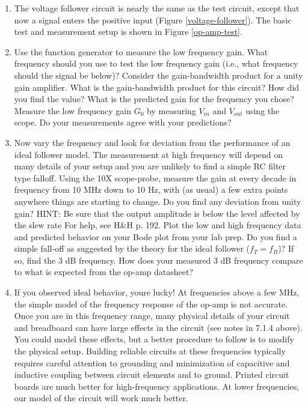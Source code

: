 \documentclass[10pt]{PhysLab1C} %
\begin{document}
\begin{enumerate}
\def\labelenumi{\arabic{enumi}.}
\item
  The voltage follower circuit is nearly the same as the test circuit,
  except that now a signal enters the positive input (Figure \ref{voltage-follower}). The basic
  test and measurement setup is shown in Figure \ref{op-amp-test}.
\item
  Use the function generator to measure the low frequency gain. What
  frequency should you use to test the low frequency gain (i.e., what
  frequency should the signal be below)? Consider the gain-bandwidth
  product for a unity gain amplifier. What is the gain-bandwidth product
  for this circuit? How did you find the value? What is the predicted
  gain for the frequency you chose? Measure the low frequency gain
  \(G_0\) by measuring \(V_{in}\) and \(V_{out}\) using the scope. Do
  your measurements agree with your predictions?
\item
  Now vary the frequency and look for deviation from the performance of
  an ideal follower model. The measurement at high frequency will depend
  on many details of your setup and you are unlikely to find a simple RC
  filter type falloff. Using the 10X scope-probe, measure the gain at
  every decade in frequency from 10 MHz down to 10 Hz, with (as usual) a
  few extra points anywhere things are starting to change. Do you find
  any deviation from unity gain? HINT: Be sure that the output amplitude
  is below the level affected by the slew rate For help, see H\&H p.
  192. Plot the low and high frequency data and predicted behavior on
  your Bode plot from your lab prep. Do you find a simple fall-off as
  suggested by the theory for the ideal follower (\(f_T=f_B\))? If so,
  find the 3 dB frequency. How does your measured 3 dB frequency compare
  to what is expected from the op-amp datasheet?
\item
  If you observed ideal behavior, you\textquotesingle re lucky! At
  frequencies above a few MHz, the simple model of the frequency
  response of the op-amp is not accurate. Once you are in this frequency
  range, many physical details of your circuit and breadboard can have
  large effects in the circuit (see notes in 7.1.4 above). You could
  model these effects, but a better procedure to follow is to modify the
  physical setup. Building reliable circuits at these frequencies
  typically requires careful attention to grounding and minimization of
  capacitive and inductive coupling between circuit elements and to
  ground. Printed circuit boards are much better for high-frequency
  applications. At lower frequencies, our model of the circuit will work
  much better.
\end{enumerate}
\end{document}
